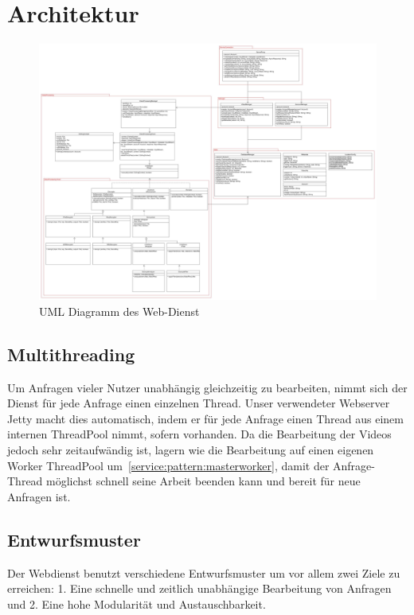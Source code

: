 \section{Architektur}

\begin{figure}[ht]
	\centering
\includegraphics[width=1\textwidth]{./resources/Diagramme/Webservice/UMLSERVERPCC.jpg}
\caption{UML Diagramm des Web-Dienst}
	\label{service:fig:modules_overview}
\end{figure}

\subsection{Multithreading}
Um Anfragen vieler Nutzer unabhängig gleichzeitig zu bearbeiten, nimmt sich der Dienst für jede Anfrage einen einzelnen Thread. Unser verwendeter Webserver Jetty macht dies automatisch, indem er für jede Anfrage einen Thread aus einem internen ThreadPool nimmt, sofern vorhanden.\newline
Da die Bearbeitung der Videos jedoch sehr zeitaufwändig ist, lagern wie die Bearbeitung auf einen eigenen Worker ThreadPool um~\eqref{service:pattern:masterworker}, damit der Anfrage-Thread möglichst schnell seine Arbeit beenden kann und bereit für neue Anfragen ist. 

\subsection{Entwurfsmuster} \label{service:pattern}
Der Webdienst benutzt verschiedene Entwurfsmuster um vor allem zwei Ziele zu erreichen: 1. Eine schnelle und zeitlich unabhängige Bearbeitung von Anfragen und 2. Eine hohe Modularität und Austauschbarkeit.

